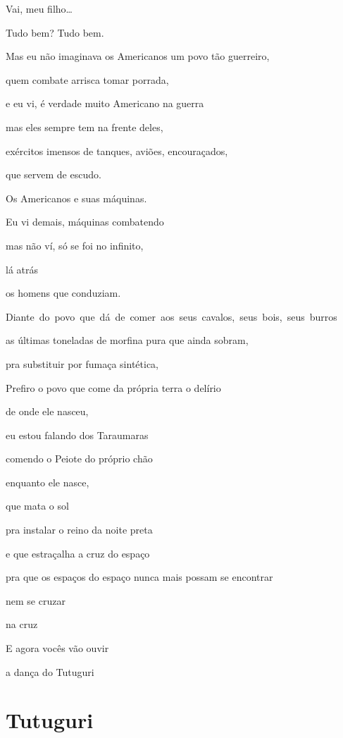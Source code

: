 Vai, meu filho\ldots{}


Tudo bem? Tudo bem.

Mas eu não imaginava os Americanos um povo tão guerreiro,

quem combate arrisca tomar porrada,

e eu vi, é verdade muito Americano na guerra

mas eles sempre tem na frente deles,

exércitos imensos de tanques, aviões, encouraçados,

que servem de escudo.

Os Americanos e suas máquinas. 

Eu vi demais, máquinas combatendo

mas não ví, só se foi no infinito, 

lá atrás

os homens que conduziam.


\mbox{Diante do povo que dá de comer aos seus cavalos, seus bois, seus burros}

as últimas toneladas de morfina pura que ainda sobram, 

pra substituir por fumaça sintética, 

Prefiro o povo que come da própria terra o delírio \EP[2]

de onde ele nasceu,

eu estou falando dos Taraumaras


comendo o Peiote do próprio chão

enquanto ele nasce, 

que mata o sol

pra instalar o reino da noite preta

e que estraçalha a cruz do espaço

pra que os espaços do espaço nunca mais possam se encontrar

nem se cruzar

na cruz

E agora vocês vão ouvir

a dança do Tutuguri


\chapter{Tutuguri}

